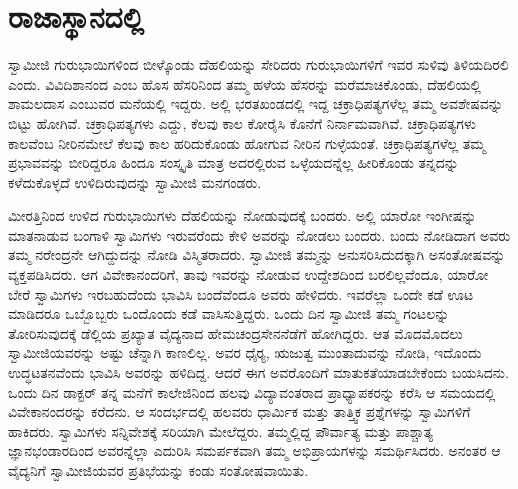 
\chapter{ರಾಜಾಸ್ಥಾನದಲ್ಲಿ}

ಸ್ವಾಮೀಜಿ ಗುರುಭಾಯಿಗಳಿಂದ ಬೀಳ್ಕೊಂಡು ದೆಹಲಿಯನ್ನು ಸೇರಿದರು ಗುರುಭಾಯಿಗಳಿಗೆ ಇವರ ಸುಳಿವು ತಿಳಿಯದಿರಲಿ ಎಂದು. ವಿವಿದಿಶಾನಂದ ಎಂಬ ಹೊಸ ಹೆಸರಿನಿಂದ ತಮ್ಮ ಹಳೆಯ ಹೆಸರನ್ನು ಮರೆಮಾಚಿಕೊಂಡು, ದೆಹಲಿಯಲ್ಲಿ ಶಾಮಲದಾಸ ಎಂಬುವರ ಮನೆಯಲ್ಲಿ ಇದ್ದರು. ಅಲ್ಲಿ ಭರತಖಂಡದಲ್ಲಿ ಇದ್ದ ಚಕ್ರಾಧಿಪತ್ಯಗಳೆಲ್ಲ ತಮ್ಮ ಅವಶೇಷವನ್ನು ಬಿಟ್ಟು ಹೋಗಿವೆ. ಚಕ್ರಾಧಿಪತ್ಯಗಳು ಎದ್ದು, ಕೆಲವು ಕಾಲ ಕೋರೈಸಿ ಕೊನೆಗೆ ನಿರ್ನಾಮವಾಗಿವೆ. ಚಕ್ರಾಧಿಪತ್ಯಗಳು ಕಾಲವೆಂಬ ನೀರಿನಮೇಲೆ ಕೆಲವು ಕಾಲ ಹರಿದುಕೊಂಡು ಹೋಗುವ ನೀರಿನ ಗುಳ್ಳೆಯಂತೆ. ಚಕ್ರಾಧಿಪತ್ಯಗಳೆಲ್ಲ ತಮ್ಮ ಪ್ರಭಾವವನ್ನು ಬೀರಿದ್ದರೂ ಹಿಂದೂ ಸಂಸ್ಕೃತಿ ಮಾತ್ರ ಅದರಲ್ಲಿರುವ ಒಳ್ಳೆಯದನ್ನೆಲ್ಲ ಹೀರಿಕೊಂಡು ತನ್ನದನ್ನು ಕಳೆದುಕೊಳ್ಳದೆ ಉಳಿದಿರುವುದನ್ನು ಸ್ವಾಮೀಜಿ ಮನಗಂಡರು. 

\newpage

ಮೀರತ್ತಿನಿಂದ ಉಳಿದ ಗುರುಭಾಯಿಗಳು ದೆಹಲಿಯನ್ನು ನೋಡುವುದಕ್ಕೆ ಬಂದರು. ಅಲ್ಲಿ ಯಾರೋ ಇಂಗೀಷನ್ನು ಮಾತನಾಡುವ ಬಂಗಾಳಿ ಸ್ವಾಮಿಗಳು ಇರುವರೆಂದು ಕೇಳಿ ಅವರನ್ನು ನೋಡಲು ಬಂದರು. ಬಂದು ನೋಡಿದಾಗ ಅವರು ತಮ್ಮ ನರೇಂದ್ರನೇ ಆಗಿದ್ದುದನ್ನು ನೋಡಿ ವಿಸ್ಮಿತರಾದರು. ಸ್ವಾಮೀಜಿ ತಮ್ಮನ್ನು ಅನುಸರಿಸಿದುದಕ್ಕಾಗಿ ಅಸಂತೋಷವನ್ನು ವ್ಯಕ್ತಪಡಿಸಿದರು. ಆಗ ವಿವೇಕಾನಂದರಿಗೆ, ತಾವು ಇವರನ್ನು ನೋಡುವ ಉದ್ದೇಶದಿಂದ ಬರಲಿಲ್ಲವೆಂದೂ, ಯಾರೋ ಬೇರೆ ಸ್ವಾಮಿಗಳು ಇರಬಹುದೆಂದು ಭಾವಿಸಿ ಬಂದೆವೆಂದೂ ಅವರು ಹೇಳಿದರು. ಇವರೆಲ್ಲಾ ಒಂದೇ ಕಡೆ ಊಟ ಮಾಡಿದರೂ ಒಬ್ಬೊಬ್ಬರು ಒಂದೊಂದು ಕಡೆ ವಾಸಿಸುತ್ತಿದ್ದರು. ಒಂದು ದಿನ ಸ್ವಾಮೀಜಿ ತಮ್ಮ ಗಂಟಲನ್ನು ತೋರಿಸುವುದಕ್ಕೆ ಡೆಲ್ಲಿಯ ಪ್ರಖ್ಯಾತ ವೈದ್ಯನಾದ ಹೇಮಚಂದ್ರಸೇನನೆಡೆಗೆ ಹೋಗಿದ್ದರು. ಆತ ಮೊದಮೊದಲು ಸ್ವಾಮೀಜಿಯವರನ್ನು ಅಷ್ಟು ಚೆನ್ನಾಗಿ ಕಾಣಲಿಲ್ಲ. ಅವರ ಧೈರ‍್ಯ, ಋಜುತ್ವ ಮುಂತಾದುವನ್ನು ನೋಡಿ, ಇದೊಂದು ಉದ್ಧಟತನವೆಂದು ಭಾವಿಸಿ ಅವರನ್ನು ಹಳಿದಿದ್ದ. ಆದರೆ ಈಗ ಅವರೊಂದಿಗೆ ಮಾತುಕತೆಯಾಡಬೇಕೆಂದು ಬಯಸಿದನು. ಒಂದು ದಿನ ಡಾಕ್ಟರ್ ತನ್ನ ಮನೆಗೆ ಕಾಲೇಜಿನಿಂದ ಹಲವು ವಿದ್ಯಾವಂತರಾದ ಪ್ರಾಧ್ಯಾಪಕರನ್ನು ಕರೆಸಿ ಆ ಸಮಯದಲ್ಲಿ ವಿವೇಕಾನಂದರನ್ನು ಕರೆದನು. ಆ ಸಂದರ್ಭದಲ್ಲಿ ಹಲವರು ಧಾರ್ಮಿಕ ಮತ್ತು ತಾತ್ತ್ವಿಕ ಪ್ರಶ್ನೆಗಳನ್ನು ಸ್ವಾಮಿಗಳಿಗೆ ಹಾಕಿದರು. ಸ್ವಾಮಿಗಳು ಸನ್ನಿವೇಶಕ್ಕೆ ಸರಿಯಾಗಿ ಮೇಲೆದ್ದರು. ತಮ್ಮಲ್ಲಿದ್ದ ಪೌರ್ವಾತ್ಯ ಮತ್ತು ಪಾಶ್ಚಾತ್ಯ ಜ್ಞಾನಭಂಡಾರದಿಂದ ಅವರನ್ನೆಲ್ಲಾ ಎದುರಿಸಿ ಸಮರ್ಪಕವಾಗಿ ತಮ್ಮ ಅಭಿಪ್ರಾಯಗಳನ್ನು ಸಮರ್ಥಿಸಿದರು. ಅನಂತರ ಆ ವೈದ್ಯನಿಗೆ ಸ್ವಾಮೀಜಿಯವರ ಪ್ರತಿಭೆಯನ್ನು ಕಂಡು ಸಂತೋಷವಾಯಿತು. 


